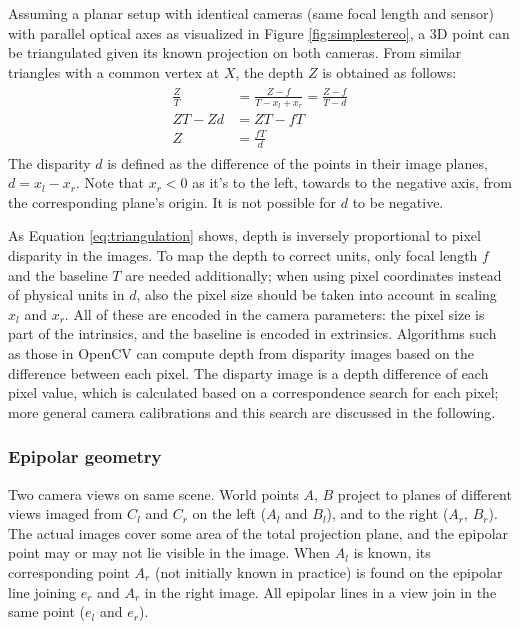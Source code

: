 Assuming a planar setup with identical cameras (same focal length and sensor) with parallel optical axes as visualized in Figure \ref{fig:simplestereo}, a 3D point can be triangulated given its known projection on both cameras.
From similar triangles with a common vertex at $X$, the depth $Z$ is obtained as follows:
\begin{align} \label{eq:triangulation} \begin{split}
	\frac{Z}{T} &= \frac{Z-f}{T - x_l + x_r} = \frac{Z-f}{T - d}\\
	ZT - Zd &= ZT - fT\\
	Z &= \frac{fT}{d}
\end{split} \end{align}
The disparity $d$ is defined as the difference of the points in their image planes, $d = x_l - x_r$.
Note that $x_r < 0$ as it's to the left, towards to the negative axis, from the corresponding plane's origin.
It is not possible for $d$ to be negative.

As Equation \ref{eq:triangulation} shows, depth is inversely proportional to pixel disparity in the images.
To map the depth to correct units, only focal length $f$ and the baseline $T$ are needed additionally; when using pixel coordinates instead of physical units in $d$, also the pixel size should be taken into account in scaling $x_l$ and $x_r$.
All of these are encoded in the camera parameters: the pixel size is part of the intrinsics, and the baseline is encoded in extrinsics.
Algorithms such as those in OpenCV \cite{opencv} can compute depth from disparity images based on the difference between each pixel.
The disparty image is a depth difference of each pixel value, which is calculated based on a correspondence search for each pixel;
more general camera calibrations and this search are discussed in the following.


\subsubsection{Epipolar geometry} %

{Two camera views on same scene.
World points $A$, $B$ project to planes of different views imaged from $C_l$ and $C_r$ on the left ($A_l$ and $B_l$), and to the right ($A_r$, $B_r$).
The actual images cover some area of the total projection plane, and the epipolar point may or may not lie visible in the image.
When $A_l$ is known, its corresponding point $A_r$ (not initially known in practice) is found on the epipolar line joining $e_r$ and $A_r$ in the right image.
All epipolar lines in a view join in the same point ($e_l$ and $e_r$).}

